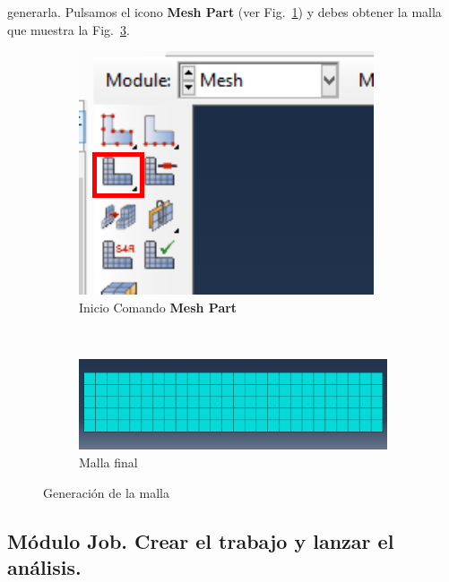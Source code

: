 \begin{enumerate}
  generarla. Pulsamos el icono \textbf{Mesh Part} (ver
  Fig.~\ref{figu59}) y debes obtener la malla que muestra la
  Fig.~\ref{figu60}.
  \begin{figure}[H]
    \centering
    \begin{subfigure}{0.35\textwidth}
      \includegraphics[width=\textwidth]{./body/images/imagen59.pdf}
      \caption{Inicio Comando \textbf{Mesh Part} }
      \label{figu59}
    \end{subfigure}%
    ~ %
    \begin{subfigure}{0.60\textwidth}
      \includegraphics[width=\textwidth]{./body/images/imagen60}
      \caption{Malla final}
      \label{figu60}
    \end{subfigure}%
    \caption{Generación de la malla}
  \end{figure}
\end{enumerate}
\newpage
\subsection{Módulo Job. Crear el trabajo y lanzar el análisis.}

